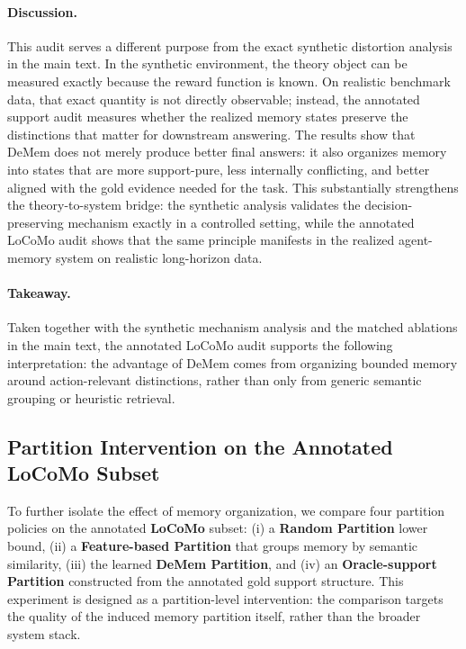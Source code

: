 \documentclass{article}
\theoremstyle{plain}
\theoremstyle{definition}
\theoremstyle{remark}
\begin{document}
\paragraph{Discussion.}
This audit serves a different purpose from the exact synthetic distortion analysis in the main text.
In the synthetic environment, the theory object can be measured exactly because the reward function is known.
On realistic benchmark data, that exact quantity is not directly observable; instead, the annotated support audit measures whether the realized memory states preserve the distinctions that matter for downstream answering.
The results show that DeMem does not merely produce better final answers: it also organizes memory into states that are more support-pure, less internally conflicting, and better aligned with the gold evidence needed for the task.
This substantially strengthens the theory-to-system bridge:
the synthetic analysis validates the decision-preserving mechanism exactly in a controlled setting, while the annotated LoCoMo audit shows that the same principle manifests in the realized agent-memory system on realistic long-horizon data.

\paragraph{Takeaway.}
Taken together with the synthetic mechanism analysis and the matched ablations in the main text, the annotated LoCoMo audit supports the following interpretation:
the advantage of DeMem comes from organizing bounded memory around action-relevant distinctions, rather than only from generic semantic grouping or heuristic retrieval.

\subsection{Partition Intervention on the Annotated LoCoMo Subset}
\label{app:partition-intervention}

To further isolate the effect of memory organization, we compare four partition policies on the annotated \textbf{LoCoMo} subset:
(i) a \textbf{Random Partition} lower bound,
(ii) a \textbf{Feature-based Partition} that groups memory by semantic similarity,
(iii) the learned \textbf{DeMem Partition},
and (iv) an \textbf{Oracle-support Partition} constructed from the annotated gold support structure.
This experiment is designed as a partition-level intervention: the comparison targets the quality of the induced memory partition itself, rather than the broader system stack.
\end{document}
